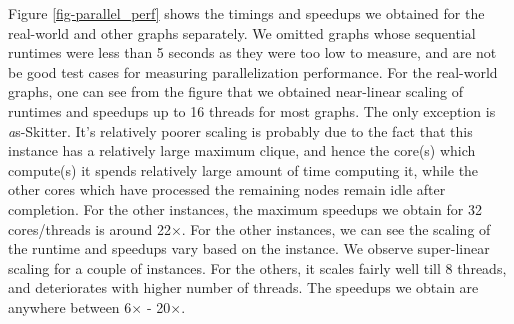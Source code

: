 Figure \ref{fig-parallel_perf} shows the timings and speedups we obtained for the real-world and other graphs separately. We omitted graphs whose sequential runtimes were less than 5 seconds as they were too low to measure, and are not be good test cases for measuring parallelization performance. For the real-world graphs, one can see from the figure that we obtained near-linear scaling of runtimes and speedups up to 16 threads for most graphs. The only exception is {\emph as-Skitter}. It's relatively poorer scaling is probably due to the fact that this instance has a relatively large maximum clique, and hence the core(s) which compute(s) it spends relatively large amount of time computing it, while the other cores which have processed the remaining nodes remain idle after completion. For the other instances, the maximum speedups we obtain for 32 cores/threads is around 22$\times$. 
For the other instances, we can see the scaling of the runtime and speedups vary based on the instance. We observe super-linear scaling for a couple of instances. For the others, it scales fairly well till 8 threads, and deteriorates with higher number of threads. The speedups we obtain are anywhere between 6$\times$ - 20$\times$.









